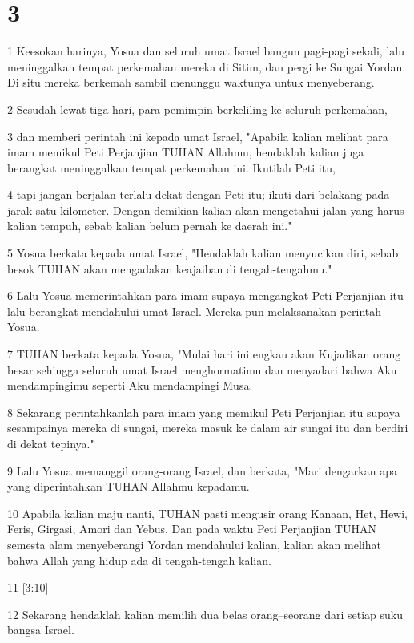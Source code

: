 \chapter{3}

\par 1 Keesokan harinya, Yosua dan seluruh umat Israel bangun pagi-pagi sekali, lalu meninggalkan tempat perkemahan mereka di Sitim, dan pergi ke Sungai Yordan. Di situ mereka berkemah sambil menunggu waktunya untuk menyeberang.
\par 2 Sesudah lewat tiga hari, para pemimpin berkeliling ke seluruh perkemahan,
\par 3 dan memberi perintah ini kepada umat Israel, "Apabila kalian melihat para imam memikul Peti Perjanjian TUHAN Allahmu, hendaklah kalian juga berangkat meninggalkan tempat perkemahan ini. Ikutilah Peti itu,
\par 4 tapi jangan berjalan terlalu dekat dengan Peti itu; ikuti dari belakang pada jarak satu kilometer. Dengan demikian kalian akan mengetahui jalan yang harus kalian tempuh, sebab kalian belum pernah ke daerah ini."
\par 5 Yosua berkata kepada umat Israel, "Hendaklah kalian menyucikan diri, sebab besok TUHAN akan mengadakan keajaiban di tengah-tengahmu."
\par 6 Lalu Yosua memerintahkan para imam supaya mengangkat Peti Perjanjian itu lalu berangkat mendahului umat Israel. Mereka pun melaksanakan perintah Yosua.
\par 7 TUHAN berkata kepada Yosua, "Mulai hari ini engkau akan Kujadikan orang besar sehingga seluruh umat Israel menghormatimu dan menyadari bahwa Aku mendampingimu seperti Aku mendampingi Musa.
\par 8 Sekarang perintahkanlah para imam yang memikul Peti Perjanjian itu supaya sesampainya mereka di sungai, mereka masuk ke dalam air sungai itu dan berdiri di dekat tepinya."
\par 9 Lalu Yosua memanggil orang-orang Israel, dan berkata, "Mari dengarkan apa yang diperintahkan TUHAN Allahmu kepadamu.
\par 10 Apabila kalian maju nanti, TUHAN pasti mengusir orang Kanaan, Het, Hewi, Feris, Girgasi, Amori dan Yebus. Dan pada waktu Peti Perjanjian TUHAN semesta alam menyeberangi Yordan mendahului kalian, kalian akan melihat bahwa Allah yang hidup ada di tengah-tengah kalian.
\par 11 [3:10]
\par 12 Sekarang hendaklah kalian memilih dua belas orang--seorang dari setiap suku bangsa Israel.
